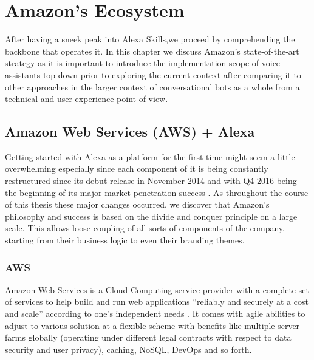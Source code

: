 







\chapter{Amazon's Ecosystem}
\label{amznecosys}

%



After having a sneek peak into Alexa Skills,we proceed by comprehending the backbone that operates it.
In this chapter we discuss Amazon's state-of-the-art strategy
as it is important to introduce the implementation scope of voice assistants 
top down
prior to exploring the current context 
after comparing it to other approaches in the larger context of conversational bots as a whole from a technical and user experience point of view. 


\section[Amazon Web Services + Alexa]{Amazon Web Services (AWS) + Alexa}


Getting started with Alexa as a platform for the first time might seem a little overwhelming especially since each component of it is being  constantly restructured since its debut release in November 2014 and with Q4 2016 being the beginning of its major market penetration success \cite{gartnerpreds17}. %
As throughout the course of this thesis these major changes occurred, we discover that Amazon's philosophy and success is based on the divide and conquer principle on  a large scale. This allows loose coupling of all sorts of components of the company, starting from their business logic to even their branding themes. %
 

\subsection*{AWS}
Amazon Web Services is a Cloud Computing service provider with a complete set of services to help build and run web applications ``reliably and securely at a cost and scale'' according to one's independent needs \cite{aws_website}.
It comes with agile abilities to adjust to various solution at a flexible scheme with benefits like multiple server farms globally (operating under different legal contracts with respect to data security and user privacy), caching, NoSQL, DevOps and so forth.


